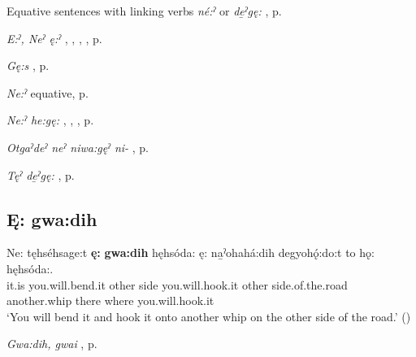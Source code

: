 \begin{CayugaRelated}
\item Equative sentences with linking verbs \textit{né:ˀ}  or \textit{de̱ˀgę:} , p. \pageref{Equative sentences with linking verbs [né:ˀ], [deˀgę:]}\\
\item \textit{E:ˀ, Neˀ ę:ˀ} , , , , p. \pageref{p:[ę:ˀ], [neˀ ę:ˀ] `isn’t it so?’}\\
\item \textit{Gę:s} , p. \pageref{p:[gę:s]}\\
\item \textit{Ne:ˀ} equative, p. \pageref{p:[ne:ˀ] equative}\\
\item \textit{Ne:ˀ he:gę:} , , , p. \pageref{p:[ne:ˀ he:gę:]}\\
\item \textit{Otgaˀdeˀ neˀ niwa:gęˀ ni-} , p. \pageref{p:[otgaˀdeˀ neˀ niwa:gęˀ ni-]}\\
\item \textit{Tęˀ de̱ˀgę:} , p. \pageref{p:[tęˀ deˀgę:]}
\end{CayugaRelated}

\subsection*{\textbf{Ę: gwa:dih} } \label{p:[ę: gwa:dih]}

\largerpage
\ea
\label{ex:enpart4}
\gll Ne: tęhséhsage:t \textbf{ę:} \textbf{gwa:dih} hęhsóda: ę: na̱ˀohahá:dih degyohǫ́:do:t to hǫ: hęhsóda:.\\
it.is you.will.bend.it other side you.will.hook.it other side.of.the.road another.whip there where you.will.hook.it\\
\glt ‘You will bend it and hook it onto another whip on the other side of the road.’ (\cite{mithun_how_1980})
\z

\begin{CayugaRelated}
\item \textit{Gwa:dih, gwai} , p. \pageref{p:[gwa:dih]}
\end{CayugaRelated}

